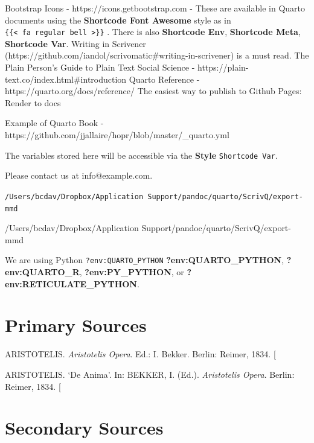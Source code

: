 \documentclass[
  12pt,
  a4paper,
  oneside,
  titlepage,
  toclink=all,
  toc=bibliography]{scrbook}
\newlength{\cslhangindent}
\newlength{\cslentryspacingunit} %
\newenvironment{CSLReferences}[2] %
 {%
  \setlength{\parindent}{0pt}
  \ifodd #1
  \let\oldpar\par
  \def\par{\hangindent=\cslhangindent\oldpar}
  \fi
  \setlength{\parskip}{#2\cslentryspacingunit}
 }%
 {}
\theoremstyle{plain}
\theoremstyle{definition}
\theoremstyle{definition}
\theoremstyle{plain}
\theoremstyle{plain}
\theoremstyle{plain}
\theoremstyle{definition}
\theoremstyle{plain}
\theoremstyle{remark}
\begin{document}
\protect\hypertarget{scriv209}{}{} Bootstrap Icons -
https://icons.getbootstrap.com - These are available in Quarto documents
using the \textbf{Shortcode Font Awesome} style as in
\texttt{\{\{\textless{}\ fa\ regular\ bell\ \textgreater{}\}\}} . There
is also \textbf{Shortcode Env}, \textbf{Shortcode Meta},
\textbf{Shortcode Var}. Writing in Scrivener
(https://github.com/iandol/scrivomatic\#writing-in-scrivener) is a must
read. The Plain Person's Guide to Plain Text Social Science -
https://plain-text.co/index.html\#introduction Quarto Reference -
https://quarto.org/docs/reference/ The easiest way to publish to Github
Pages: Render to docs

Example of Quarto Book -
https://github.com/jjallaire/hopr/blob/master/\_quarto.yml

The variables stored here will be accessible via the \textbf{Style}
\texttt{Shortcode\ Var}.

Please contact us at info@example.com.

\texttt{/Users/bcdav/Dropbox/Application\ Support/pandoc/quarto/ScrivQ/export-mmd}

/Users/bcdav/Dropbox/Application Support/pandoc/quarto/ScrivQ/export-mmd

We are using Python \texttt{?env:QUARTO\_PYTHON}
\textbf{?env:QUARTO\_PYTHON}, \textbf{?env:QUARTO\_R},
\textbf{?env:PY\_PYTHON}, or \textbf{?env:RETICULATE\_PYTHON}.

\hypertarget{sec-scriv210}{%
\chapter{Primary Sources}\label{sec-scriv210}}

\hypertarget{refs_scriv210}{}
\begin{CSLReferences}{0}{1}
\leavevmode{}%
ARISTOTELIS. \emph{Aristotelis Opera}. Ed.: I. Bekker. Berlin: Reimer,
1834. {[}\Acrobatmenu{GoBack}{$\hookleftarrow$}{]}

\leavevmode{}%
ARISTOTELIS. {`De Anima'}. In: BEKKER, I. (Ed.). \emph{Aristotelis
Opera}. Berlin: Reimer, 1834.
{[}\Acrobatmenu{GoBack}{$\hookleftarrow$}{]}

\end{CSLReferences}

\hypertarget{sec-scriv211}{%
\chapter{Secondary Sources}\label{sec-scriv211}}
\end{document}
